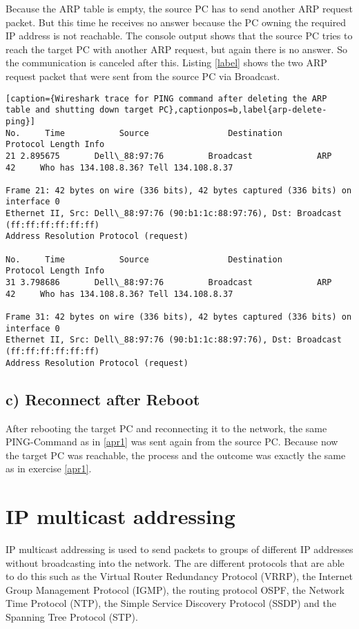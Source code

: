 Because the ARP table is empty, the source PC has to send another ARP request packet. But this time he receives no answer because the PC owning the required IP address is not reachable. The console output shows that the source PC tries to reach the target PC with another ARP request, but again there is no answer. So the communication is canceled after this. Listing \ref{label} shows the two ARP request packet that were sent from the source PC via Broadcast.\\
 \begin{lstlisting}[caption={Wireshark trace for PING command after deleting the ARP table and shutting down target PC},captionpos=b,label{arp-delete-ping}]
No.     Time           Source                Destination           Protocol Length Info
21 2.895675       Dell\_88:97:76         Broadcast             ARP      42     Who has 134.108.8.36? Tell 134.108.8.37

Frame 21: 42 bytes on wire (336 bits), 42 bytes captured (336 bits) on interface 0
Ethernet II, Src: Dell\_88:97:76 (90:b1:1c:88:97:76), Dst: Broadcast (ff:ff:ff:ff:ff:ff)
Address Resolution Protocol (request)

No.     Time           Source                Destination           Protocol Length Info
31 3.798686       Dell\_88:97:76         Broadcast             ARP      42     Who has 134.108.8.36? Tell 134.108.8.37

Frame 31: 42 bytes on wire (336 bits), 42 bytes captured (336 bits) on interface 0
Ethernet II, Src: Dell\_88:97:76 (90:b1:1c:88:97:76), Dst: Broadcast (ff:ff:ff:ff:ff:ff)
Address Resolution Protocol (request)
 \end{lstlisting}
 
\subsection{c) Reconnect after Reboot}
After rebooting the target PC and reconnecting it to the network, the same PING-Command as in \ref{apr1} was sent again from the source PC. Because now the target PC was reachable, the process and the outcome was exactly the same as in exercise \ref{apr1}.
\section{IP multicast addressing}
IP multicast addressing is used to send packets to groups of different IP addresses without broadcasting into the network. The are different protocols that are able to do this such as the Virtual Router Redundancy Protocol (VRRP), the Internet Group Management Protocol (IGMP), the routing protocol OSPF, the Network Time Protocol (NTP), the Simple Service Discovery Protocol (SSDP) and the Spanning Tree Protocol (STP).
